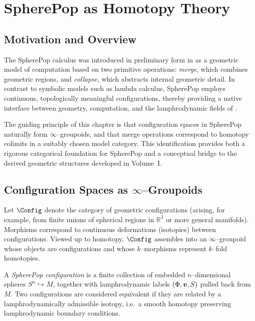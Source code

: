 
\chapter{SpherePop as Homotopy Theory}
\label{chap:spherepop-homotopy}

\section{Motivation and Overview}

The SpherePop calculus was introduced in preliminary form in
\cite{Flyxion-SpherePop-v1} as a geometric model of computation based
on two primitive operations: \emph{merge}, which combines geometric
regions, and \emph{collapse}, which abstracts internal geometric detail.
In contrast to symbolic models such as lambda calculus, SpherePop
employs continuous, topologically meaningful configurations, thereby
providing a native interface between geometry, computation,
and the lamphrodynamic fields of \rsvpabbr{}.

The guiding principle of this chapter is that configuration spaces in
SpherePop naturally form $\infty$--groupoids, and that merge operations
correspond to homotopy colimits in a suitably chosen model category.
This identification provides both a rigorous categorical foundation
for SpherePop and a conceptual bridge to the derived geometric
structures developed in Volume~I.

\section{Configuration Spaces as $\infty$--Groupoids}

Let $\Config$ denote the category of geometric configurations
(arising, for example, from finite unions of spherical regions in
$\mathbb{R}^3$ or more general manifolds). Morphisms correspond to
continuous deformations (isotopies) between configurations. Viewed
up to homotopy, $\Config$ assembles into an $\infty$--groupoid whose
objects are configurations and whose $k$--morphisms represent
$k$--fold homotopies.

\begin{definition}
A \emph{SpherePop configuration} is a finite collection of embedded
$n$--dimensional spheres $S^n \hookrightarrow M$, together with
lamphrodynamic labels $(\Phi,\bm{v},S)$ pulled back
from $M$. Two configurations are considered equivalent if they are
related by a lamphrodynamically admissible isotopy, i.e.\ a smooth
homotopy preserving lamphrodynamic boundary conditions.
\end{definition}

